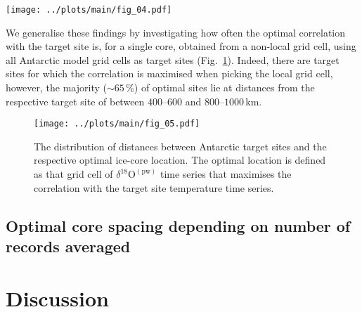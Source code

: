 \documentclass[cp, manuscript]{copernicus}
\begin{document}
\begin{figure*}[t]%
\centering
\texttt{[image: ../plots/main/fig\_04.pdf]}
\caption[Picking optimal sites]{%
  Picking ice core sites that optimally reconstruct interannual temperatures at
  EDML and Vostok. The maps show the correlation in the model data between the
  interannual temperature time series at the target sites (black crosses) EDML
  (\textbf{a}--\textbf{c}) and Vostok (\textbf{d}--\textbf{f}) with the fields
  of precipitation-weighted oxygen isotope composition. Filled black circles
  denote those grid cells that maximise the correlation with the target site
  temperature for choosing either a single grid cell ($N=1$; \textbf{a},
  \textbf{d}) or for averaging across $N=3$ (\textbf{b}, \textbf{e}) or $N=5$
  (\textbf{c}, \textbf{f}) grid cells.}
\label{fig:picking}%
\end{figure*}%

We generalise these findings by investigating how often the optimal correlation
with the target site is, for a single core, obtained from a non-local grid cell,
using all Antarctic model grid cells as target sites
(Fig.~\ref{fig:picking.hist}). Indeed, there are target sites for which the
correlation is maximised when picking the local grid cell, however, the majority
($\sim65$\,\%) of optimal sites lie at distances from the respective target site
of between $400$--$600$ and $800$--$1000$\,km.

\begin{figure}[t]%
\centering
\texttt{[image: ../plots/main/fig\_05.pdf]}
\caption{%
  The distribution of distances between Antarctic target sites and the
  respective optimal ice-core location. The optimal location is defined as that
  grid cell of $\delta^{18}\mathrm{O}^{\mathrm{(pw)}}$ time series that
  maximises the correlation with the target site temperature time series.}
\label{fig:picking.hist}%
\end{figure}%

\subsection{Optimal core spacing depending on number of records averaged}
\label{results:optim-spacing}



\section{Discussion}\label{discussion}
\end{document}
